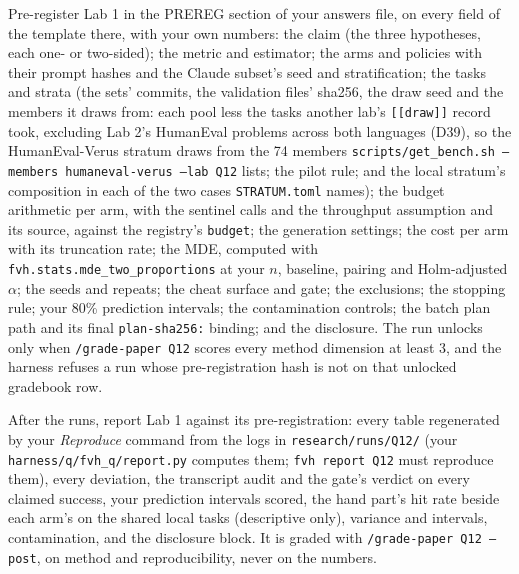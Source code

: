 \documentclass[11pt]{article}
\begin{document}
\begin{problem}\label{prob:B1}
Pre-register Lab 1 in the PREREG section of your answers file, on every field
of the template there, with your own numbers: the claim (the three hypotheses,
each one- or two-sided); the metric and estimator; the arms and policies with
their prompt hashes and the Claude subset's seed and stratification; the tasks
and strata (the sets' commits, the validation files' sha256, the draw seed and
the members it draws from: each pool less the tasks another lab's
\texttt{[[draw]]} record took, excluding Lab 2's HumanEval problems across both
languages (D39), so the HumanEval-Verus stratum draws from the 74 members
\texttt{scripts/get\_bench.sh --members humaneval-verus --lab Q12} lists; the
pilot rule; and the local stratum's composition in each of the two cases
\texttt{STRATUM.toml} names); the budget arithmetic per arm, with the sentinel
calls and the throughput assumption and its source, against the registry's
\texttt{budget}; the generation settings; the cost per arm with its
truncation rate; the MDE, computed with
\texttt{fvh.stats.mde\_two\_proportions} at your $n$, baseline, pairing and
Holm-adjusted $\alpha$; the seeds and repeats; the cheat surface and gate;
the exclusions; the stopping rule; your 80\% prediction intervals; the
contamination controls; the batch plan path and its final \texttt{plan-sha256:} binding;
and the disclosure. The run unlocks only when
\texttt{/grade-paper Q12} scores every method dimension at least 3, and the
harness refuses a run whose pre-registration hash is not on that unlocked
gradebook row.
\end{problem}

\begin{problem}\label{prob:B2}
After the runs, report Lab 1 against its pre-registration: every table
regenerated by your \emph{Reproduce} command from the logs in
\texttt{research/runs/Q12/} (your \texttt{harness/q/fvh\_q/report.py}
computes them; \texttt{fvh report Q12} must reproduce them), every deviation,
the transcript audit and the gate's verdict on every claimed success, your
prediction intervals scored, the hand part's hit rate beside each arm's on the
shared local tasks (descriptive only), variance and intervals, contamination,
and the disclosure block. It is graded with \texttt{/grade-paper Q12 --post},
on method and reproducibility, never on the numbers.
\end{problem}
\end{document}
